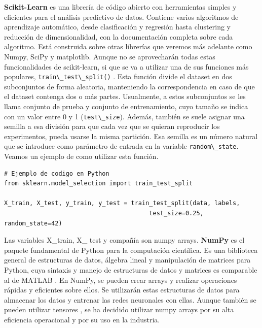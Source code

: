 \textbf{Scikit-Learn} \citep{scikitlearn} es una librería de código abierto con herramientas simples y eficientes para el análisis predictivo de datos. Contiene varios algoritmos de aprendizaje automático, desde clasificación y regresión hasta clustering y reducción de dimensionalidad, con la documentación completa sobre cada algoritmo. Está construida sobre otras librerías que veremos más adelante como Numpy, SciPy y matplotlib. Aunque no se aprovecharán todas estas funcionalidades de scikit-learn, si que se va a utilizar una de sus funciones más populares, \lstinline|train\_test\_split()| \citep{traintestsplit}. Esta función divide el dataset en dos subconjuntos de forma aleatoria, manteniendo la correspondencia en caso de que el dataset contenga dos o más partes. Usualmente, a estos subconjuntos se les llama conjunto de prueba y conjunto de entrenamiento, cuyo tamaño se indica con un valor entre 0 y 1 (\lstinline|test\_size|). Además, también se suele asignar una semilla a esa división para que cada vez que se quieran reproducir los experimentos, pueda usarse la misma partición. Esa semilla es un número natural que se introduce como parámetro de entrada en la variable \lstinline|random\_state|. Veamos un ejemplo de como utilizar esta función.


\lstset{language=Python}
\begin{lstlisting}
# Ejemplo de codigo en Python
from sklearn.model_selection import train_test_split

X_train, X_test, y_train, y_test = train_test_split(data, labels,
                                        test_size=0.25, random_state=42)
\end{lstlisting}


Las variables X\_train, X\_ test y compañía son numpy arrays. \textbf{NumPy} \citep{numpy} es el paquete fundamental de Python para la computación científica. Es una biblioteca general de estructuras de datos, álgebra lineal y manipulación de matrices para Python, cuya sintaxis y manejo de estructuras de datos y matrices es comparable al de MATLAB \citep{bloice2016tutorial}. En NumPy, se pueden crear arrays y realizar operaciones rápidas y eficientes sobre ellos. Se utilizarán estas estructuras de datos para almacenar los datos y entrenar las redes neuronales con ellas. Aunque también se pueden utilizar tensores \citep{modeltraining}, se ha decidido utilizar numpy arrays por su alta eficiencia operacional y por su uso en la industria.


